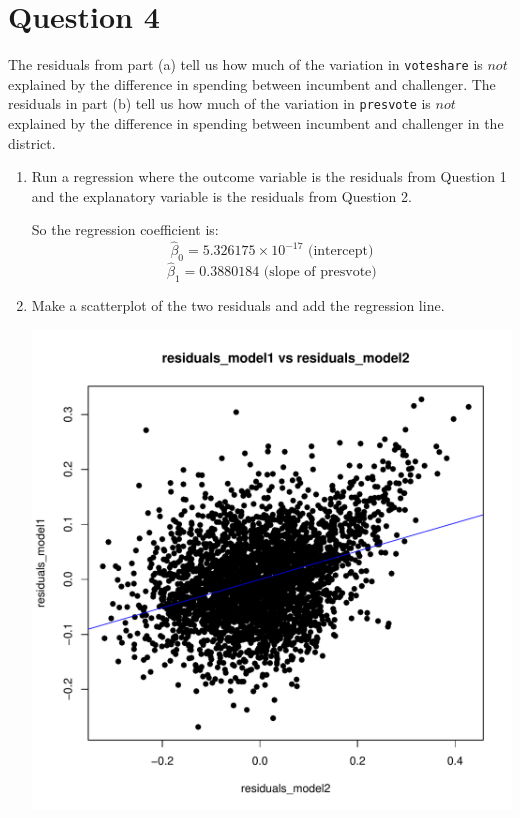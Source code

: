 \documentclass[12pt,letterpaper]{article}
\begin{document}
\newpage	
\section*{Question 4}
\noindent The residuals from part (a) tell us how much of the variation in \texttt{voteshare} is $not$ explained by the difference in spending between incumbent and challenger. The residuals in part (b) tell us how much of the variation in \texttt{presvote} is $not$ explained by the difference in spending between incumbent and challenger in the district.
	\begin{enumerate}
		\item Run a regression where the outcome variable is the residuals from Question 1 and the explanatory variable is the residuals from Question 2.	
		
		\vspace{.5cm}
		 
		So the regression coefficient is:\\
		$$
		\hat{\beta}_0 = 5.326175\times 10^{-17}  \text{ (intercept)}
		$$
		$$
		\hat{\beta}_1 = 0.3880184 \text{ (slope of presvote)}
		$$
		\vspace{.5cm}
		
		\item Make a scatterplot of the two residuals and add the regression line. 	\
		
		\vspace{.5cm}
		 
		\begin{center}
			\includegraphics[width=0.7\linewidth]{"scatter_plot4"}
		\end{center}
		

\end{enumerate}
\end{document}
